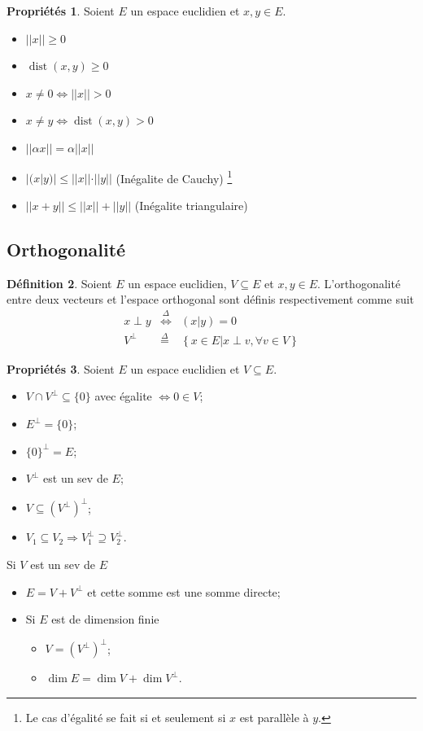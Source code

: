 \documentclass[11pt,a4paper]{article}
\theoremstyle{definition}
\newtheorem{mydef}{Définition}[section]
\newtheorem{myprop}[mydef]{Propriétés}
\DeclareMathOperator{\dist}{dist}
\begin{document}
\begin{myprop}
	Soient $E$ un espace euclidien et $x,y \in E$.
	\begin{itemize}
		\item $||x|| \geq 0$
		\item $\dist(x, y) \geq 0$
		\item $x \neq 0 \iff ||x|| > 0$
		\item $x \neq y \iff \dist(x, y) > 0$
		\item $||\alpha x|| = \alpha||x||$
		\item $|(x | y)| \leq ||x||\cdot||y||$ (Inégalite de Cauchy)
			\footnote{Le cas d'égalité se fait si et seulement si $x$ est parallèle à $y$.}
		\item $||x + y|| \leq ||x|| + ||y||$ (Inégalite triangulaire)
	\end{itemize}
\end{myprop}

\subsection{Orthogonalité}

\begin{mydef}
	Soient $E$ un espace euclidien, $V \subseteq E$ et $x,y \in E$.
	L'orthogonalité entre deux vecteurs et l'espace orthogonal sont définis respectivement comme suit
	\begin{eqnarray*}
		x \perp y & \stackrel{\Delta}{\Leftrightarrow} & (x|y) = 0\\
		V^{\perp} & \stackrel{\Delta}{=} & \left\{x \in E | x \perp v, \forall v \in V\right\}
	\end{eqnarray*}
\end{mydef}

\begin{myprop}
	Soient $E$ un espace euclidien et $V \subseteq E$.
	\begin{itemize}
		\item $V \cap V^{\perp} \subseteq \{0\}$ avec égalite $\iff 0 \in V$;
		\item $E^{\perp} = \{0\}$;
		\item $\{0\}^{\perp} = E$;
		\item $V^{\perp}$ est un sev de $E$;
		\item $V \subseteq \left( V^{\perp} \right) ^{\perp}$;
		\item $V_1 \subseteq V_2 \Rightarrow V_1^{\perp} \supseteq V_2^{\perp}$.
	\end{itemize}
	Si $V$ est un sev de $E$
	\begin{itemize}
		\item $E = V + V^{\perp}$ et cette somme est une somme directe;
		\item
			Si $E$ est de dimension finie
			\begin{itemize}
				\item $V = \left( V^\perp \right)^\perp$;
				\item $\dim E = \dim V + \dim V^{\perp}$.
			\end{itemize}
	\end{itemize}
\end{myprop}
\end{document}
